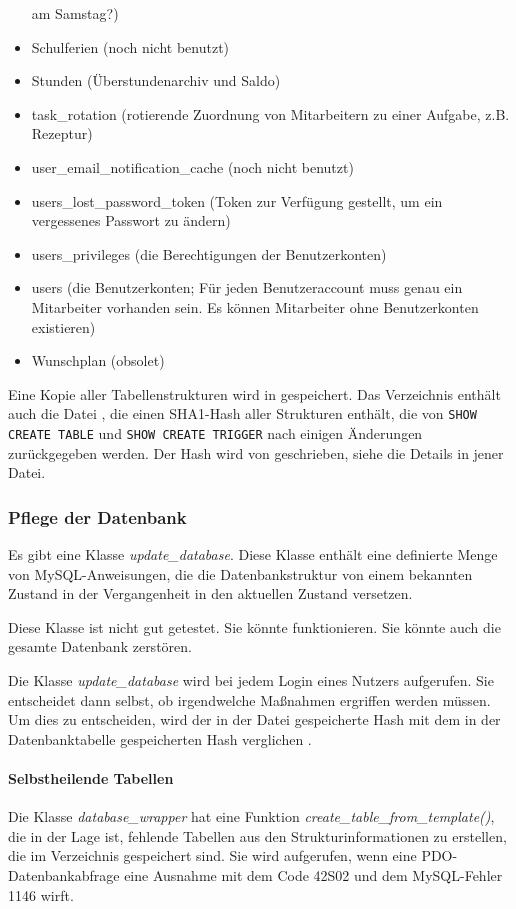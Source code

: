 \begin{itemize}
am Samstag?)
\item Schulferien (noch nicht benutzt)
\item Stunden (Überstundenarchiv und Saldo)
\item task\_rotation (rotierende Zuordnung von Mitarbeitern zu einer Aufgabe,
z.B. Rezeptur)
\item user\_email\_notification\_cache (noch nicht benutzt)
\item users\_lost\_password\_token (Token zur Verfügung gestellt, um ein
vergessenes Passwort zu ändern)
\item users\_privileges (die Berechtigungen der Benutzerkonten)
\item users (die Benutzerkonten; Für jeden Benutzeraccount muss genau ein
Mitarbeiter vorhanden sein. Es können Mitarbeiter ohne Benutzerkonten
existieren)
\item Wunschplan (obsolet)
\end{itemize}


Eine Kopie aller Tabellenstrukturen wird in 
gespeichert. Das Verzeichnis enthält auch die Datei
, die einen SHA1-Hash aller
Strukturen enthält, die von \lstinline|SHOW CREATE TABLE|  und
\lstinline|SHOW CREATE TRIGGER| nach einigen Änderungen zurückgegeben
werden. Der Hash wird von 
geschrieben, siehe die Details in jener Datei.

\subsubsection{Pflege der Datenbank}
Es gibt eine Klasse \emph{update\_database}. Diese Klasse enthält eine
definierte Menge von MySQL-Anweisungen, die die Datenbankstruktur von einem
bekannten Zustand in der Vergangenheit in den aktuellen Zustand versetzen.

Diese Klasse ist nicht gut getestet. Sie könnte funktionieren. Sie könnte
auch die gesamte Datenbank zerstören.

Die Klasse \emph{update\_database} wird bei jedem Login eines Nutzers
aufgerufen. Sie entscheidet dann selbst, ob irgendwelche Maßnahmen ergriffen
werden müssen.  Um dies zu entscheiden, wird der in der Datei
 gespeicherte Hash mit dem in der
Datenbanktabelle gespeicherten Hash verglichen
.

\paragraph{Selbstheilende Tabellen}
Die Klasse \emph{database\_wrapper} hat eine Funktion
\emph{create\_table\_from\_template()}, die in der Lage ist, fehlende
Tabellen aus den Strukturinformationen zu erstellen, die im Verzeichnis
 gespeichert sind. Sie wird aufgerufen, wenn eine
PDO-Datenbankabfrage eine Ausnahme mit dem Code 42S02 und dem MySQL-Fehler
1146 wirft.

